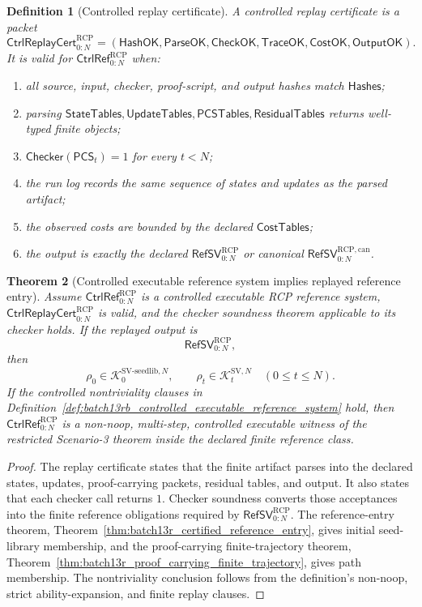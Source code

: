 \documentclass[11pt]{article}
\newtheorem{theorem}{Theorem}[section]
\newtheorem{definition}[theorem]{Definition}
\newcommand{\1}{\mathbf{1}}
\newcommand{\RCP}{\mathrm{RCP}}
\providecommand{\Kcal}{\mathcal{K}}
\begin{document}
\begin{definition}[Controlled replay certificate]
\label{def:batch13rb_controlled_replay_certificate}
A controlled replay certificate is a packet
\[
\mathsf{CtrlReplayCert}_{0:N}^{\RCP}
=(\mathsf{HashOK},\mathsf{ParseOK},\mathsf{CheckOK},\mathsf{TraceOK},\mathsf{CostOK},\mathsf{OutputOK}).
\]
It is valid for \(\mathsf{CtrlRef}_{0:N}^{\RCP}\) when:
\begin{enumerate}[label=(\roman*),leftmargin=1.5em]
    \item all source, input, checker, proof-script, and output hashes match \(\mathsf{Hashes}\);
    \item parsing \(\mathsf{StateTables},\mathsf{UpdateTables},\mathsf{PCSTables},\mathsf{ResidualTables}\) returns well-typed finite objects;
    \item \(\mathsf{Checker}(\mathsf{PCS}_t)=1\) for every \(t<N\);
    \item the run log records the same sequence of states and updates as the parsed artifact;
    \item the observed costs are bounded by the declared \(\mathsf{CostTables}\);
    \item the output is exactly the declared \(\mathsf{RefSV}_{0:N}^{\RCP}\) or canonical \(\mathsf{RefSV}_{0:N}^{\RCP,\mathrm{can}}\).
\end{enumerate}
\end{definition}

\begin{theorem}[Controlled executable reference system implies replayed reference entry]
\label{thm:batch13rb_controlled_executable_reference_system_implies_entry}
Assume \(\mathsf{CtrlRef}_{0:N}^{\RCP}\) is a controlled executable RCP reference system, \(\mathsf{CtrlReplayCert}_{0:N}^{\RCP}\) is valid, and the checker soundness theorem applicable to its checker holds.  If the replayed output is
\[
\mathsf{RefSV}_{0:N}^{\RCP},
\]
then
\[
\rho_0\in\Kcal_0^{\mathrm{SV\mbox{-}seedlib},N},
\qquad
\rho_t\in\Kcal_t^{\mathrm{SV},N}\quad(0\le t\le N).
\]
If the controlled nontriviality clauses in Definition~\ref{def:batch13rb_controlled_executable_reference_system} hold, then \(\mathsf{CtrlRef}_{0:N}^{\RCP}\) is a non-noop, multi-step, controlled executable witness of the restricted Scenario-3 theorem inside the declared finite reference class.
\end{theorem}

\begin{proof}
The replay certificate states that the finite artifact parses into the declared states, updates, proof-carrying packets, residual tables, and output.  It also states that each checker call returns \(1\).  Checker soundness converts those acceptances into the finite reference obligations required by \(\mathsf{RefSV}_{0:N}^{\RCP}\).  The reference-entry theorem, Theorem~\ref{thm:batch13r_certified_reference_entry}, gives initial seed-library membership, and the proof-carrying finite-trajectory theorem, Theorem~\ref{thm:batch13r_proof_carrying_finite_trajectory}, gives path membership.  The nontriviality conclusion follows from the definition's non-noop, strict ability-expansion, and finite replay clauses.
\end{proof}
\end{document}
